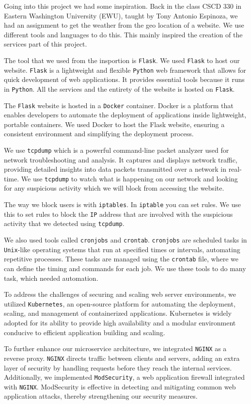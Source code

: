 Going into this project we had some inspiration. Back in the class CSCD 330 in Eastern Washington University (EWU), taught by Tony Antonio Espinoza, we had an assignment to get the weather from the geo location of a website. We use different tools and languages to do this. This mainly inspired the creation of the services part of this project.

The tool that we used from the insportion is \verb+Flask+. We used \verb+Flask+ to host our website. \verb+Flask+ is a lightweight and flexible \verb+Python+ web framework that allows for quick development of web applications. It provides essential tools because it runs in \verb+Python+. All the services and the entirety of the website is hosted on \verb+Flask+. 

The \verb+Flask+ website is hosted in a \verb+Docker+ container. Docker is a platform that enables developers to automate the deployment of applications inside lightweight, portable containers. We used Docker to host the Flask website, ensuring a consistent environment and simplifying the deployment process.

We use \verb+tcpdump+ which is a powerful command-line packet analyzer used for network troubleshooting and analysis. It captures and displays network traffic, providing detailed insights into data packets transmitted over a network in real-time. We use \verb+tcpdump+ to watch what is happening on our network and looking for any suspicious activity which we will block from accessing the website.

The way we block users is with \verb+iptables+. In \verb+iptable+ you can set rules. We use this to set rules to block the \verb+IP+ address that are involved with the suspicious activity that we detected using \verb+tcpdump+.

We also used tools called \verb+cronjobs+ and \verb+crontab+. \verb+cronjobs+ are scheduled tasks in \verb+Unix+-like operating systems that run at specified times or intervals, automating repetitive processes. These tasks are managed using the \verb+crontab+ file, where we can define the timing and commands for each job. We use these tools to do many task, which needed automation.

To address the challenges of securing and scaling web server environments, we utilized \verb+Kubernetes+, an open-source platform for automating the deployment, scaling, and management of containerized applications. Kubernetes is widely adopted for its ability to provide high availability and a modular environment conducive to efficient application building and scaling. 

To further enhance our microservice architecture, we integrated \verb+NGINX+ as a reverse proxy. \verb+NGINX+ directs traffic between clients and servers, adding an extra layer of security by handling requests before they reach the internal services. Additionally, we implemented \verb+ModSecurity+, a web application firewall integrated with \verb+NGINX+. ModSecurity is effective in detecting and mitigating common web application attacks, thereby strengthening our security measures.
